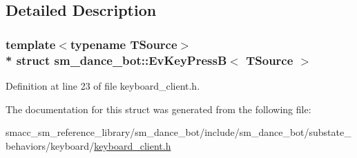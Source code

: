 \subsection{Detailed Description}
\subsubsection*{template$<$typename T\+Source$>$\\*
struct sm\+\_\+dance\+\_\+bot\+::\+Ev\+Key\+Press\+B$<$ T\+Source $>$}



Definition at line 23 of file keyboard\+\_\+client.\+h.



The documentation for this struct was generated from the following file\+:\begin{DoxyCompactItemize}
\item 
smacc\+\_\+sm\+\_\+reference\+\_\+library/sm\+\_\+dance\+\_\+bot/include/sm\+\_\+dance\+\_\+bot/substate\+\_\+behaviors/keyboard/\hyperlink{keyboard__client_8h}{keyboard\+\_\+client.\+h}\end{DoxyCompactItemize}
